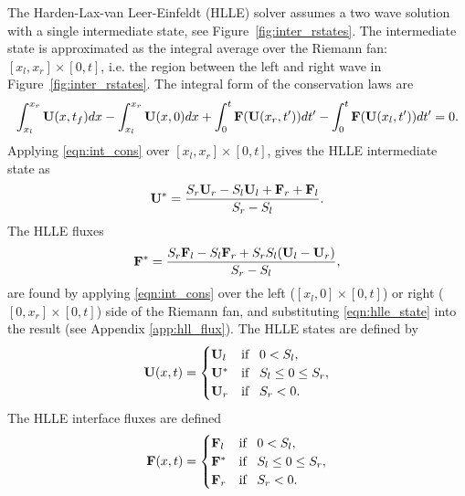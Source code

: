 The Harden-Lax-van Leer-Einfeldt (HLLE) \citep{Einfeldt:1988} solver assumes a two wave solution with a single intermediate state, see Figure~\ref{fig:inter_rstates}.  The intermediate state is approximated as the integral average over the Riemann fan: $[x_l,x_r] \times [0,t]$, i.e. the region between the left and right wave in Figure~\ref{fig:inter_rstates}.   The integral form of the conservation laws are
\begin{gather}
\label{eqn:int_cons}
\int_{x_l}^{x_r} \mathbf{U}(x,t_f) dx - \int_{x_l}^{x_r} \mathbf{U}(x,0) dx + \int_{0}^{t} \mathbf{F}(\mathbf{U}(x_r,t')) dt'
- \int_{0}^{t} \mathbf{F}(\mathbf{U}(x_l,t')) dt' = 0.
\end{gather}
Applying \eqref{eqn:int_cons} over $[x_l,x_r] \times [0,t]$, gives the HLLE intermediate state as
\begin{gather}
\label{eqn:hlle_state}
\mathbf{U}^* = \frac{S_r \mathbf{U}_r - S_l \mathbf{U}_l + \mathbf{F}_r + \mathbf{F}_l }{S_r - S_l}.
\end{gather}
The HLLE fluxes 
\begin{gather}
\label{eqn:hlle_flux}
\mathbf{F}^* = \frac{S_r \mathbf{F}_l - S_l \mathbf{F}_r + S_r S_l (\mathbf{U}_l - \mathbf{U}_r) }{S_r - S_l},
\end{gather}
are found by applying \eqref{eqn:int_cons} over the left ($[x_l,0] \times [0,t]$) or right ($[0,x_r] \times [0,t]$) side of the Riemann fan, and substituting \eqref{eqn:hlle_state} into the result (see Appendix \ref{app:hll_flux}).  The HLLE states are defined by
\begin{gather}
\label{eqn:hlle_states}
\mathbf{U}(x,t) = 
\begin{cases}
\mathbf{U}_l   & \text{if}\;\;\; 0 < S_l, \\
\mathbf{U}^*   & \text{if}\;\;\; S_l \le 0 \le S_r, \\
\mathbf{U}_r   & \text{if}\;\;\; S_r < 0. \\
\end{cases}
\end{gather}
The HLLE interface fluxes are defined 
\begin{gather}
\label{eqn:hlle_fluxes}
\mathbf{F}(x,t) = 
\begin{cases}
\mathbf{F}_l   & \text{if}\;\;\; 0 < S_l, \\
\mathbf{F}^*   & \text{if}\;\;\; S_l \le 0 \le S_r, \\
\mathbf{F}_r   & \text{if}\;\;\; S_r < 0. \\
\end{cases}
\end{gather}

